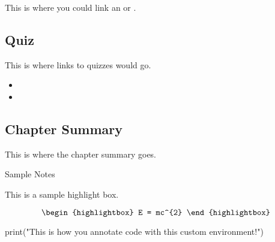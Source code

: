 This is where you could link an  or . 

\subsection{Quiz}

This is where links to quizzes would go.

\begin{itemize}
    \item {} 
    \item {} 
\end{itemize}

\subsection{Chapter Summary}

This is where the chapter summary goes.

\begin{notes}{Sample Notes}
    \begin{highlight}
        This is a sample highlight box.

        \begin{equation*}
            \begin{highlightbox}
                E = mc^{2}
            \end{highlightbox}
        \end{equation*}
        \lipsum[1-5]
    \end{highlight}
    \begin{code}[Python]
    print("This is how you annotate code with this custom environment!")
    \end{code}
\end{notes}
